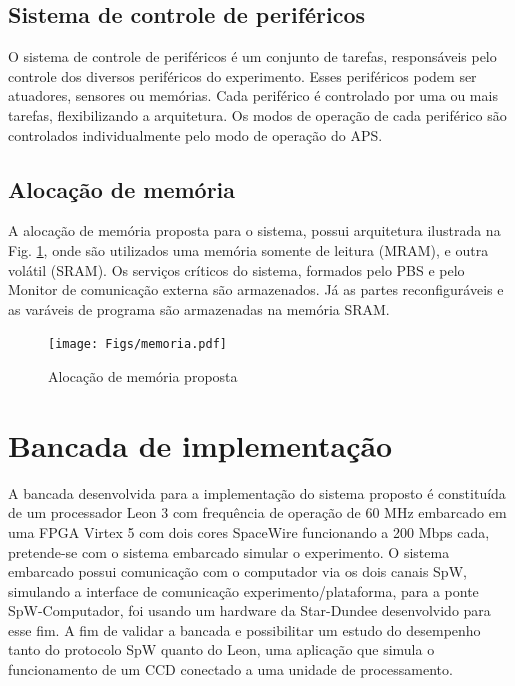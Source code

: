 \documentclass[journal,a4paper,oneside,twocolumn]{IEEEtran}
\begin{document}
\subsection{Sistema de controle de periféricos}

	O sistema de controle de periféricos é um conjunto de tarefas, responsáveis pelo controle dos diversos periféricos do experimento. Esses periféricos podem ser atuadores, sensores ou memórias. Cada periférico é controlado por uma ou mais tarefas, flexibilizando a arquitetura. Os modos de operação de cada periférico são controlados individualmente pelo modo de operação do APS.
	
\subsection{Alocação de memória}

	A alocação de memória proposta para o sistema, possui arquitetura ilustrada na Fig. \ref{fig:mem}, onde são utilizados uma memória somente de leitura (MRAM), e outra volátil (SRAM). Os serviços críticos do sistema, formados pelo PBS e pelo Monitor de comunicação externa são armazenados. Já as partes reconfiguráveis e as varáveis de programa são armazenadas na memória SRAM.

	\begin{figure}[!t]
	\centering
	\texttt{[image: Figs/memoria.pdf]}
	\caption{Alocação de memória proposta}
	\label{fig:mem}
	\end{figure}	 


	

\section{Bancada de implementação}
	
	A bancada desenvolvida para a implementação do sistema proposto é constituída de um processador Leon 3 com frequência de operação de 60 MHz embarcado em uma FPGA Virtex 5 com dois cores SpaceWire funcionando a 200 Mbps cada, pretende-se com o sistema embarcado simular o experimento. O sistema embarcado possui comunicação com o computador via os dois canais SpW, simulando a interface de comunicação experimento/plataforma, para a ponte SpW-Computador, foi usando um hardware da Star-Dundee desenvolvido para esse fim.  A fim de validar a bancada e possibilitar um estudo do desempenho tanto do protocolo SpW quanto do Leon, uma aplicação que simula o funcionamento de um CCD conectado a uma unidade de processamento.
	
\end{document}
